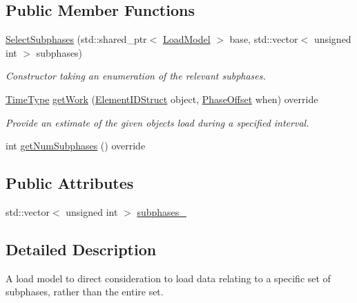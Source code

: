 \subsection*{Public Member Functions}
\begin{DoxyCompactItemize}
\item 
\hyperlink{classvt_1_1vrt_1_1collection_1_1balance_1_1_select_subphases_a6eeee8aa0dce1a0483549835006a0bed}{Select\+Subphases} (std\+::shared\+\_\+ptr$<$ \hyperlink{classvt_1_1vrt_1_1collection_1_1balance_1_1_load_model}{Load\+Model} $>$ base, std\+::vector$<$ unsigned int $>$ subphases)
\begin{DoxyCompactList}\small\item\em Constructor taking an enumeration of the relevant subphases. \end{DoxyCompactList}\item 
\hyperlink{namespacevt_a876a9d0cd5a952859c72de8a46881442}{Time\+Type} \hyperlink{classvt_1_1vrt_1_1collection_1_1balance_1_1_select_subphases_a77cf76f7699c9480483cb4104bf58965}{get\+Work} (\hyperlink{structvt_1_1vrt_1_1collection_1_1balance_1_1_element_i_d_struct}{Element\+I\+D\+Struct} object, \hyperlink{structvt_1_1vrt_1_1collection_1_1balance_1_1_phase_offset}{Phase\+Offset} when) override
\begin{DoxyCompactList}\small\item\em Provide an estimate of the given object\textquotesingle{}s load during a specified interval. \end{DoxyCompactList}\item 
int \hyperlink{classvt_1_1vrt_1_1collection_1_1balance_1_1_select_subphases_a347673e0bbc4ded04f32d97fea8f5b68}{get\+Num\+Subphases} () override
\end{DoxyCompactItemize}
\subsection*{Public Attributes}
\begin{DoxyCompactItemize}
\item 
std\+::vector$<$ unsigned int $>$ \hyperlink{classvt_1_1vrt_1_1collection_1_1balance_1_1_select_subphases_ad9ad62b67851546a4377ee6a4e17181e}{subphases\+\_\+}
\end{DoxyCompactItemize}


\subsection{Detailed Description}
A load model to direct consideration to load data relating to a specific set of subphases, rather than the entire set. 

